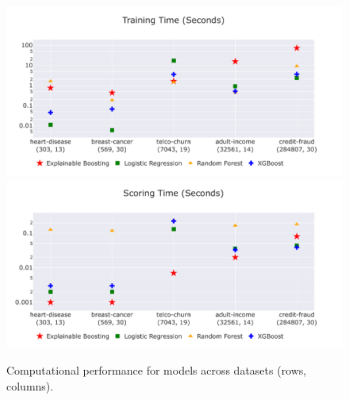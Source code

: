 \documentclass[twoside,11pt]{article}
\begin{document}

\begin{figure}[ht]
    \centering
    \includegraphics[scale=0.28]{images/fit-time-09-18.pdf}
    \includegraphics[scale=0.28]{images/score-time-09-18.pdf}
    \caption{Computational performance for models across datasets (rows, columns).}
    \label{fig:comp_perf}
\end{figure}
\end{document}

